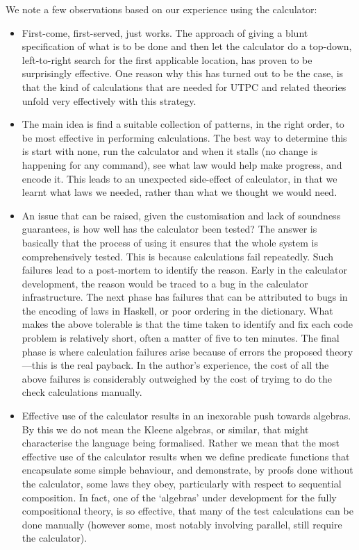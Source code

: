 We note a few observations based on our experience
using the calculator:
\begin{itemize}
  \item
   First-come, first-served, just works.
   The approach of giving a blunt specification of what is to be done
   and then let the calculator do a top-down, left-to-right search
   for the first applicable location,
   has proven to be surprisingly effective.
   One reason why this has turned out to be the case,
   is that the kind of calculations that are needed for UTPC
   and related theories unfold very effectively with this strategy.
  \item
   The main idea is find a suitable collection of patterns,
   in the right order,
   to be most effective in performing calculations.
   The best way to determine this is start with none,
   run the calculator and when it stalls
   (no change is happening for any command),
   see what law would help make progress, and encode it.
   This leads to an unexpected side-effect of calculator,
   in that we learnt what laws we needed,
   rather than what we thought we would need.
  \item
    An issue that can be raised,
    given the customisation and lack of soundness guarantees,
    is how well has the calculator been tested?
    The answer is basically that the process of using it ensures
    that the whole system is comprehensively tested.
    This is because calculations fail repeatedly.
    Such failures lead to a post-mortem to identify the reason.
    Early in the calculator development,
    the reason would be traced to a bug in the calculator infrastructure.
    The next phase has failures that can be attributed to bugs in the encoding
    of laws in Haskell, or poor ordering in the dictionary.
    What makes the above tolerable is that the time taken to identify
    and fix each code problem is relatively short,
    often a matter of five to ten minutes.
    The final phase is where calculation failures arise because of errors
    the proposed theory---this is the real payback.
    In the author's experience,
    the cost of all the above failures
    is considerably outweighed by the cost of tryimg to do the check calculations
    manually.
  \item
    Effective use of the calculator results in an inexorable
    push towards algebras. By this we do not mean the Kleene algebras,
    or similar, that might characterise the language being formalised.
    Rather we mean that the most effective use of the calculator results
    when we define predicate functions that encapsulate some simple
    behaviour, and demonstrate, by proofs done without the calculator,
    some laws they obey, particularly with respect to sequential composition.
    In fact, one of the `algebras' under development for the fully
    compositional theory, is so effective, that many of the test calculations
    can be done manually
    (however some, most notably involving parallel,
    still require the calculator).
\end{itemize}


